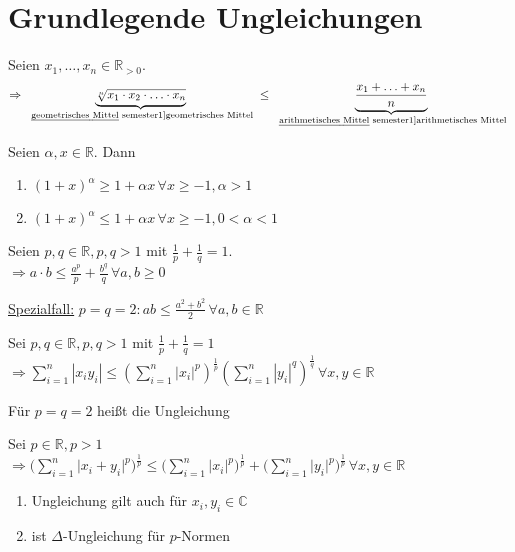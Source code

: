\section{Grundlegende Ungleichungen}
\begin{proposition}
	Seien $x_1, \dotsc, x_n\in\mathbb{R}_{>0}$.\\
	\[\Rightarrow \underbrace{\sqrt[n]{x_1\cdot x_2\cdot \dotsc \cdot x_n}}_{\text{\begriff{geometrisches Mittel}}} \le \underbrace{\frac{x_1 + \dotsc + x_n}{n}}_{\text{\begriff{arithmetisches Mittel}}}\]
\end{proposition}
\begin{proposition}
	Seien $\alpha,x\in\mathbb{R}$. Dann
	\begin{enumerate}[label={\arabic*)}]
		\item $(1+x)^\alpha \ge 1 + \alpha x\,\forall x\ge -1, \alpha > 1$
		\item $(1+x)^\alpha \le 1+\alpha x \,\forall x\ge -1, 0 < \alpha < 1$
	\end{enumerate}
\end{proposition}
\begin{proposition}
	Seien $p,q\in\mathbb{R}, p,q > 1$ mit $\frac{1}{p}+\frac{1}{q}=1$.\\
	$\Rightarrow a\cdot b \le \frac{a^p}{p} + \frac{b^q}{q}\,\forall a,b\ge 0$
	
	\uline{Spezialfall:} $p=q=2: ab \le \frac{a^2+b^2}{2} \,\forall a,b\in \mathbb{R}$
\end{proposition}
\begin{proposition}
	Sei $p,q\in\mathbb{R}, p,q > 1$ mit $\frac{1}{p} + \frac{1}{q} = 1$\\
	$\Rightarrow \sum_{i=1}^{n} |x_i y_i| \le \left(\sum_{i=1}^n |x_i|^p \right)^{\frac{1}{p}}\left(\sum_{i=1}^n |y_i|^q\right)^{\frac{1}{q}}\,\forall x,y\in\mathbb{R}$
	
	Für $p=q=2$ heißt die Ungleichung 
\end{proposition}
\begin{proposition}
	Sei $p\in\mathbb{R}, p>1$\\
    $\Rightarrow \big(\sum_{i=1}^{n} \vert x_i + y_i \vert^p \big)^\frac{1}{p} \leq \big(\sum_{i=1}^{n} \vert x_i \vert^p \big)^\frac{1}{p} + \big(\sum_{i=1}^{n} \vert y_i \vert^p \big)^\frac{1}{p}\,\forall x,y\in \mathbb{R}$
\end{proposition}

\begin{remark}
	\begin{enumerate}[label={\arabic*)}]
    \item Ungleichung gilt auch für $x_i, y_i \in \mathbb{C}$
    \item ist $\Delta$-Ungleichung für $p$-Normen
    \end{enumerate}
\end{remark}